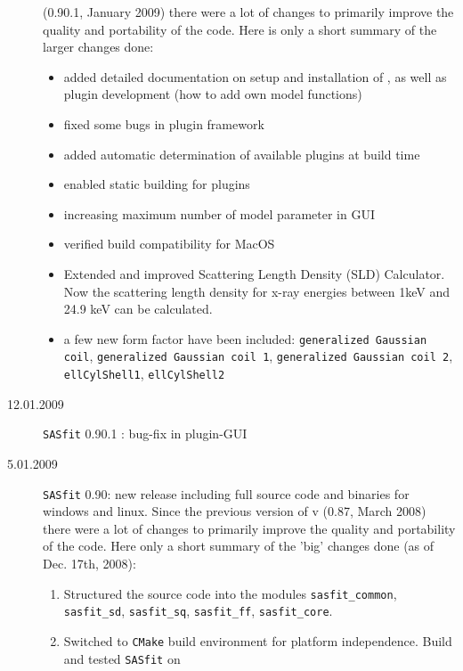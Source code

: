 \begin{description}
                    \SASfit (0.90.1, January 2009) there were a lot of changes to
                    primarily improve the quality and portability of the code. Here is
                    only a short summary of the larger changes done:
        \begin{itemize}
            \item added detailed documentation on setup and installation of \SASfit,
                  as well as plugin development (how to add own model functions)
            \item fixed some bugs in plugin framework
            \item added automatic determination of available plugins at build time
            \item enabled static building for plugins
            \item increasing maximum number of model parameter in GUI
            \item verified build compatibility for MacOS
            \item Extended and improved Scattering Length Density (SLD) Calculator.
                  Now the scattering length density for x-ray energies between 1keV
                  and 24.9 keV can be calculated.
            \item a few new form factor have been included:
                        \texttt{generalized Gaussian coil},
                        \texttt{generalized Gaussian coil 1},
                        \texttt{generalized Gaussian coil 2},
                        \texttt{ellCylShell1},
                        \texttt{ellCylShell2}
        \end{itemize}
    \item[12.01.2009]{\tt SASfit} 0.90.1 : bug-fix in plugin-GUI
    \item[5.01.2009] {\tt SASfit} 0.90:
    new release including full source code and binaries for
    windows and linux. Since the previous version of v (0.87, March 2008)
    there were a lot of changes to primarily improve the quality
    and portability of the code. Here only a short summary of the 'big'
    changes done (as of Dec. 17th, 2008):
    \begin{enumerate}
        \item Structured the source code into the modules \texttt{sasfit\_common}, \texttt{sasfit\_sd}, \texttt{sasfit\_sq},
                \texttt{sasfit\_ff}, \texttt{sasfit\_core}.
        \item Switched to {\tt CMake} build environment for platform independence. Build and tested {\tt SASfit} on

\end{enumerate}
\end{description}
